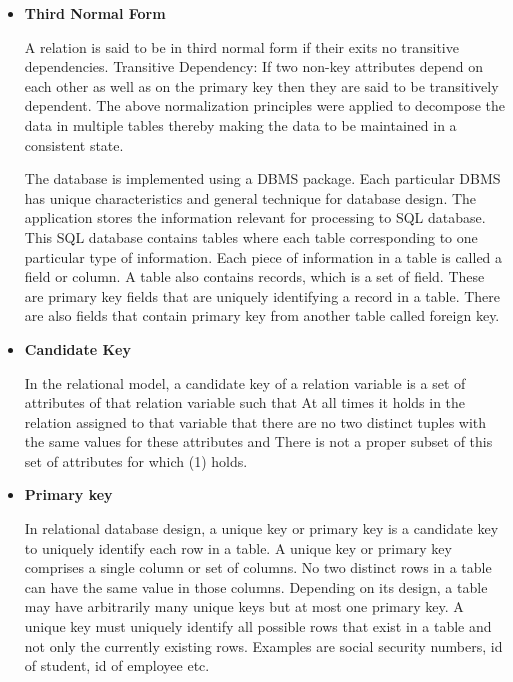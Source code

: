 \begin{itemize}
\item {\bf Third Normal Form}

A relation is said to be in third normal form if their exits no transitive dependencies. Transitive Dependency: If two non-key attributes depend on each other as well as on the primary key then they are said to be transitively dependent. The above normalization principles were applied to decompose the data in multiple tables thereby making the data to be maintained in a consistent state.

The database is implemented using a DBMS package. Each particular DBMS has unique characteristics and general technique for database design. The application stores the information relevant for processing to SQL database. This SQL database contains tables where each table corresponding to one particular type of information. Each piece of information in a table is called a field or column. A table also contains records, which is a set of field. These are primary key fields that are uniquely identifying a record in a table. There are also fields that contain primary key from another table called foreign key.
\end{itemize}

\begin{itemize}
\item {\bf Candidate Key}

 In the relational model, a candidate key of a relation variable is a set of attributes of that relation variable such that At all times it holds in the relation assigned to that variable that there are no two distinct tuples with the same values for these attributes and There is not a proper subset of this set of attributes for which (1) holds.
\end{itemize}

\begin{itemize}
\item {\bf  Primary key}

In relational database design, a unique key or primary key is a candidate key to uniquely identify each row in a table. A unique key or primary key comprises a single column or set of columns. No two distinct rows in a table can have the same value in those columns. Depending on its design, a table may have arbitrarily many unique keys but at most one primary key. A unique key must uniquely identify all possible rows that exist in a table and not only the currently existing rows. Examples are social security numbers, id of student, id of employee etc.
\end{itemize}

